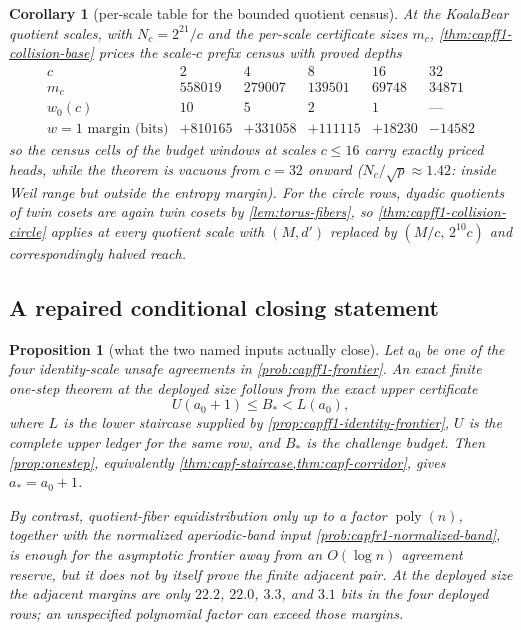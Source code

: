 \documentclass[11pt]{article}
\newtheorem{proposition}[proposition]{Proposition}
\newtheorem{corollary}[corollary]{Corollary}
\theoremstyle{definition}
\theoremstyle{remark}
\begin{document}
\begin{corollary}[per-scale table for the bounded quotient census]\label{cor:capff1-quotient-scales}
At the KoalaBear quotient scales, with $N_c=2^{21}/c$ and the per-scale certificate sizes $m_c$, \cref{thm:capff1-collision-base} prices the scale-$c$ prefix census with proved depths
\[
\begin{array}{c|ccccc}
c & 2 & 4 & 8 & 16 & 32\\ \hline
m_c & 558019 & 279007 & 139501 & 69748 & 34871\\
w_0(c) & 10 & 5 & 2 & 1 & \text{---}\\
w=1\text{ margin (bits)} & +810165 & +331058 & +111115 & +18230 & -14582
\end{array}
\]
so the census cells of the budget windows at scales $c\le16$ carry exactly priced heads, while the theorem is vacuous from $c=32$ onward \textup{($N_c/\sqrt p\approx1.42$: inside Weil range but outside the entropy margin)}.  For the circle rows, dyadic quotients of twin cosets are again twin cosets by \cref{lem:torus-fibers}, so \cref{thm:capff1-collision-circle} applies at every quotient scale with $(M,d')$ replaced by $(M/c,\,2^{10}c)$ and correspondingly halved reach.
\end{corollary}

\subsection{A repaired conditional closing statement}

\begin{proposition}[what the two named inputs actually close]\label{prop:capff1-closing}
Let $a_0$ be one of the four identity-scale unsafe agreements in \cref{prob:capff1-frontier}.  An exact finite one-step theorem at the deployed size follows from the exact upper certificate
\[
        U(a_0+1)\le B_*<L(a_0),
\]
where $L$ is the lower staircase supplied by \cref{prop:capff1-identity-frontier}, $U$ is the complete upper ledger for the same row, and $B_*$ is the challenge budget.  Then \cref{prop:onestep}, equivalently \cref{thm:capf-staircase,thm:capf-corridor}, gives $a_*=a_0+1$.

By contrast, quotient-fiber equidistribution only up to a factor $\operatorname{poly}(n)$, together with the normalized aperiodic-band input \cref{prob:capfr1-normalized-band}, is enough for the asymptotic frontier away from an $O(\log n)$ agreement reserve, but it does not by itself prove the finite adjacent pair.  At the deployed size the adjacent margins are only $22.2$, $22.0$, $3.3$, and $3.1$ bits in the four deployed rows; an unspecified polynomial factor can exceed those margins.
\end{proposition}
\end{document}

